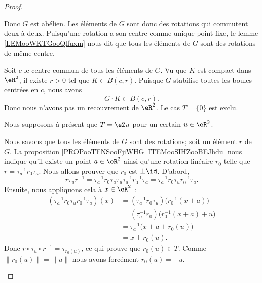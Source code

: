 \begin{proof}
\begin{subproof}
		Donc \( G\) est abélien. Les éléments de \( G\) sont donc des rotations qui commutent deux à deux. Puisqu'une rotation a son centre comme unique point fixe, le lemme \ref{LEMooWKTGooQlfuxm} nous dit que tous les éléments de \( G\) sont des rotations de même centre.

		Soit \( c\) le centre commun de tous les éléments de \( G\). Vu que \( K\) est compact dans \( \eR^2\), il existe \( r>0\) tel que \( K\subset B(c,r)\). Puisque \( G\) stabilise toutes les boules centrées en \( c\), nous avons
		\begin{equation}
			G\cdot K\subset B(c,r).
		\end{equation}
		Donc nous n'avons pas un recouvrement de \( \eR^2\). Le cas \( T=\{0 \}\) est exclu.

		\spitem[Exclusion de \( T=\eZ u\)]
		Nous supposons à présent que \( T=\eZ u\) pour un certain \( u\in \eR^2\).

		\begin{subproof}
			\spitem[\( r_0=\pm\id\)]
			Nous savons que tous les éléments de \( G\) sont des rotations; soit un élément \( r\) de \( G\). La proposition
			\ref{PROPooTFNSooFjiWHG}\ref{ITEMooSIHZooBEJhdu} nous indique qu'il existe un point \( a\in \eR^2\) ainsi qu'une rotation linéaire \( r_0\) telle que \( r=\tau_a^{-1}r_0\tau_a\). Nous allons prouver que \( r_0\) est \( \pm\id\). D'abord,
			\begin{equation}
				r\tau_u r^{-1}=\tau_a^{-1}r_0\tau_a\tau_u\tau_a^{-1}r_0^{-1}\tau_a=\tau_a^{-1}r_0\tau_ur_0^{-1}\tau_a.
			\end{equation}
			Ensuite, nous appliquons cela à \( x\in \eR^2\) :
			\begin{subequations}
				\begin{align}
					(\tau_a^{-1}r_0\tau_ur_0^{-1}\tau_a)(x) & =(\tau_a^{-1}r_0\tau_u)\big( r_0^{-1}(x+a) \big) \\
					                                        & =(\tau_a^{-1}r_0)\big( r_0^{-1}(x+a)+u \big)     \\
					                                        & =\tau_a^{-1}\big( x+a+r_0(u) \big)               \\
					                                        & =x+r_0(u).
				\end{align}
			\end{subequations}
			Donc \( r\circ\tau_u\circ r^{-1}=\tau_{r_0(u)}\), ce qui prouve que \( r_0(u)\in T\). Comme \( \| r_0(u) \|=\| u \|\) nous avons forcément \( r_0(u)=\pm u\).


\end{subproof}
\end{subproof}
\end{proof}
